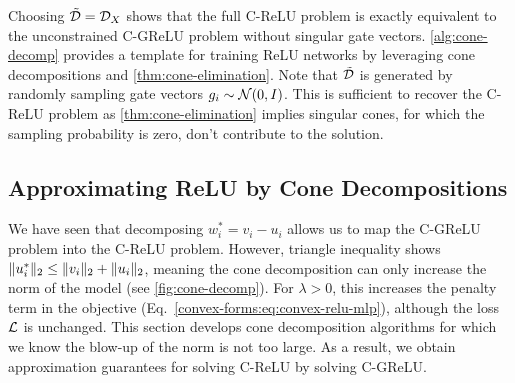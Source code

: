 Choosing \( \tilde {\mathcal{D}} = \mathcal{D}_X \) shows that the full C-ReLU
problem is exactly equivalent to the unconstrained C-GReLU problem without
singular gate vectors.
\cref{alg:cone-decomp} provides a template for training ReLU networks by leveraging cone decompositions and \cref{thm:cone-elimination}.
Note that \( \tilde {\mathcal{D}} \) is generated by randomly sampling gate vectors \( g_i \sim \mathcal{N}(0, I) \).
This is sufficient to recover the C-ReLU problem as \cref{thm:cone-elimination} implies singular cones, for which the sampling probability is zero, don't contribute to the solution.

\subsection{Approximating ReLU by Cone Decompositions}

We have seen that decomposing \( w_i^* = v_i - u_i \) allows us to map the C-GReLU problem into the C-ReLU problem.
However, triangle inequality shows \( \|u_i^*\|_2 \leq \|v_i\|_2 + \|u_i\|_2 \), meaning the cone decomposition can only increase the norm of the model (see \cref{fig:cone-decomp}).
For \( \lambda > 0 \), this increases the penalty term in the objective (Eq.~\ref{convex-forms:eq:convex-relu-mlp}), although the loss \( \mathcal{L} \) is unchanged.
This section develops cone decomposition algorithms for which we know the blow-up of the norm is not too large.
As a result, we obtain approximation guarantees for solving C-ReLU by solving C-GReLU.

